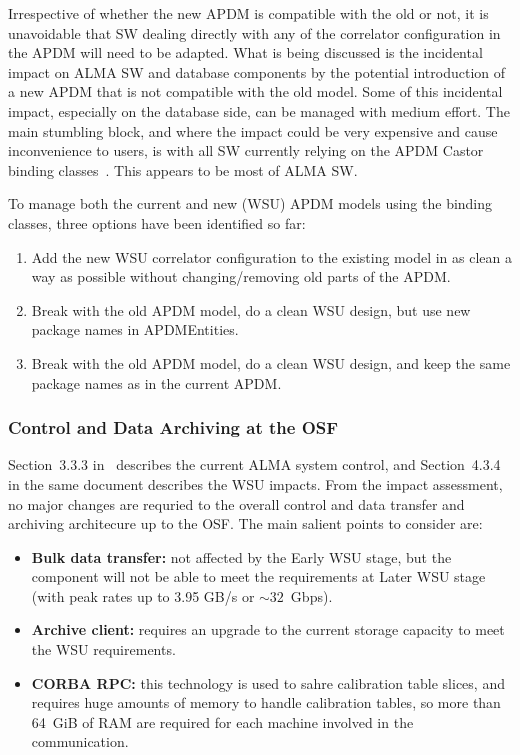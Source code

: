 Irrespective of whether the new APDM is compatible with the old or not, it is unavoidable that SW dealing directly with any of the correlator configuration in the APDM will need to be adapted. What is being discussed is the incidental impact on ALMA SW and database components by the potential introduction of a new APDM that is not compatible with the old model.
Some of this incidental impact, especially on the database side, can be managed with medium effort. The main stumbling block, and where the impact could be very expensive and cause inconvenience to users, is with all SW currently relying on the APDM Castor binding classes~\cite{apdm}. This appears to be most of ALMA SW.

To manage both the current and new (WSU) APDM models using the binding classes, three options have been identified so far:
\begin{enumerate}[itemsep=-0.5em]
\item Add the new WSU correlator configuration to the existing model in as clean a way as possible without changing/removing old parts of the APDM.
\item Break with the old APDM model, do a clean WSU design, but use new package names in APDMEntities.
\item Break with the old APDM model, do a clean WSU design, and keep the same package names as in the current APDM.
\end{enumerate}


\subsubsection{Control and Data Archiving at the OSF} %
\label{sec:WSUcontrolAndArchive}

Section~3.3.3 in~\cite{CSA-IA} describes the current ALMA system control, and Section~4.3.4 in the same document describes the WSU impacts. From the impact assessment, no major changes are requried to the overall control and data transfer and archiving architecure up to the OSF. The main salient points to consider are:

\begin{itemize}[itemsep=-0.5em]
	\item \textbf{Bulk data transfer:} not affected by the Early WSU stage, but the component will not be able to meet the requirements at Later WSU stage (with peak rates up to 3.95 GB/s or $\sim 32$~Gbps).
	\item \textbf{Archive client:} requires an upgrade to the current storage capacity to meet the WSU requirements.
	\item \textbf{CORBA RPC:} this technology is used to sahre calibration table slices, and requires huge amounts of memory to handle calibration tables, so more than 64~GiB of RAM are required for each machine involved in the communication.

\end{itemize}

